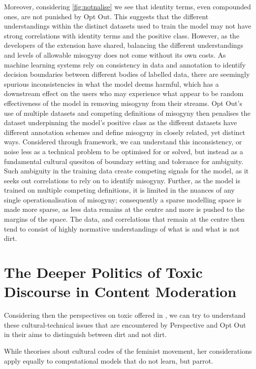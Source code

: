 Moreover, considering \autoref{fig:notnalise} we see that identity terms, even compounded ones, are not punished by Opt Out. This suggests that the different understandings within the distinct datasets used to train the model may not have strong correlations with identity terms and the positive class. However, as the developers of the extension have shared, balancing the different understandings and levels of allowable misogyny does not come without its own costs. As machine learning systems rely on consistency in data and annotation to identify decision boundaries between different bodies of labelled data, there are seemingly spurious inconsistencies in what the model deems harmful, which has a downstream effect on the users who may experience what appear to be random effectiveness of the model in removing misogyny from their streams. Opt Out's use of multiple datasets and competing definitions of misogyny then penalises the dataset underpinning the model's positive class as the different datasets have different annotation schemes and define misogyny in closely related, yet distinct ways. Considered through \citet{Douglas:1966} framework, we can understand this inconsistency, or noise less as a technical problem to be optimised for or solved, but instead as a fundamental cultural quesiton of boundary setting and tolerance for ambiguity. Such ambiguity in the training data create competing signals for the model, as it seeks out correlations to rely on to identify misogyny. Further, as the model is trained on multiple competing definitions, it is limited in the nuances of any single operationalisation of misogyny; consequently a sparse modelling space is made more sparse, as less data remains at the centre and more is pushed to the margins of the space. The data, and correlations that remain at the centre then tend to consist of highly normative understandings of what is and what is not dirt.

\section{The Deeper Politics of Toxic Discourse in Content Moderation}

Considering then the perspectives on toxic offered in \cite{Risam:2015}, we can try to understand these cultural-technical issues that are encountered by Perspective and Opt Out in their aims to distinguish between dirt and not dirt.

While \citet{Rissam:2015} theorises about cultural codes of the feminist movement, her considerations apply equally to computational models that do not learn, but parrot\citep{Bender:2020}.

